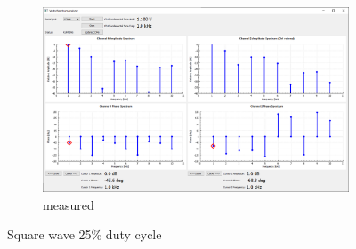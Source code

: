 \documentclass[notitlepage, a4paper, 11pt]{article}
\begin{document}
\begin{figure}[H]
\begin{subfigure}[][][t]{0.3\textwidth}
			\includegraphics[width=\textwidth, trim=10 80 555 100, clip]{../img/Circuit1/dut25}
			\caption{measured}
			\label{fig:meas-signal-a}
		\end{subfigure}
		\caption{Square wave 25\% duty cycle}
		\label{fig:pure-sin}
	\end{figure}
	
\end{document}
